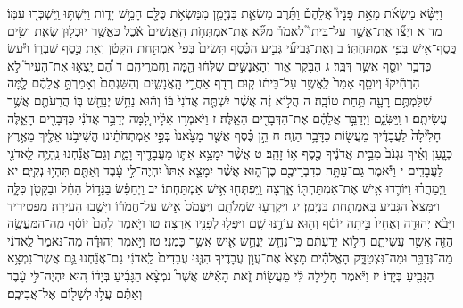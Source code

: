 \documentclass[twoside, openany, parskip=half, 11pt]{book}
\begin{document}
וַיִּשָּׂ֨א מַשְׂאֹ֜ת מֵאֵ֣ת פָּנָיו֮ אֲלֵהֶם֒ וַתֵּ֜רֶב מַשְׂאַ֧ת בִּנְיָמִ֛ן מִמַּשְׂאֹ֥ת כֻּלָּ֖ם חָמֵ֣שׁ יָד֑וֹת וַיִּשְׁתּ֥וּ וַֽיִּשְׁכְּר֖וּ עִמּֽוֹ׃ מד א וַיְצַ֞ו אֶת־אֲשֶׁ֣ר עַל־בֵּיתוֹ֮ לֵאמֹר֒ מַלֵּ֞א אֶת־אַמְתְּחֹ֤ת הָֽאֲנָשִׁים֙ אֹ֔כֶל כַּאֲשֶׁ֥ר יוּכְל֖וּן שְׂאֵ֑ת וְשִׂ֥ים כֶּֽסֶף־אִ֖ישׁ בְּפִ֥י אַמְתַּחְתּֽוֹ׃ ב וְאֶת־גְּבִיעִ֞י גְּבִ֣יעַ הַכֶּ֗סֶף תָּשִׂים֙ בְּפִי֙ אַמְתַּ֣חַת הַקָּטֹ֔ן וְאֵ֖ת כֶּ֣סֶף שִׁבְר֑וֹ וַיַּ֕עַשׂ כִּדְבַ֥ר יוֹסֵ֖ף אֲשֶׁ֥ר דִּבֵּֽר׃ ג הַבֹּ֖קֶר א֑וֹר וְהָאֲנָשִׁ֣ים שֻׁלְּח֔וּ הֵ֖מָּה וַחֲמֹרֵיהֶֽם׃ ד הֵ֠ם יָֽצְא֣וּ אֶת־הָעִיר֮ לֹ֣א הִרְחִ֒יקוּ֒ וְיוֹסֵ֤ף אָמַר֙ לַֽאֲשֶׁ֣ר עַל־בֵּית֔וֹ ק֥וּם רְדֹ֖ף אַחֲרֵ֣י הָֽאֲנָשִׁ֑ים וְהִשַּׂגְתָּם֙ וְאָמַרְתָּ֣ אֲלֵהֶ֔ם לָ֛מָּה שִׁלַּמְתֶּ֥ם רָעָ֖ה תַּ֥חַת טוֹבָֽה׃ ה הֲל֣וֹא זֶ֗ה אֲשֶׁ֨ר יִשְׁתֶּ֤ה אֲדֹנִי֙ בּ֔וֹ וְה֕וּא נַחֵ֥שׁ יְנַחֵ֖שׁ בּ֑וֹ הֲרֵעֹתֶ֖ם אֲשֶׁ֥ר עֲשִׂיתֶֽם׃ ו וַֽיַּשִּׂגֵ֑ם וַיְדַבֵּ֣ר אֲלֵהֶ֔ם אֶת־הַדְּבָרִ֖ים הָאֵֽלֶּה׃ ז וַיֹּאמְר֣וּ אֵלָ֔יו לָ֚מָּה יְדַבֵּ֣ר אֲדֹנִ֔י כַּדְּבָרִ֖ים הָאֵ֑לֶּה חָלִ֙ילָה֙ לַעֲבָדֶ֔יךָ מֵעֲשׂ֖וֹת כַּדָּבָ֥ר הַזֶּֽה׃ ח הֵ֣ן כֶּ֗סֶף אֲשֶׁ֤ר מָצָ֙אנוּ֙ בְּפִ֣י אַמְתְּחֹתֵ֔ינוּ הֱשִׁיבֹ֥נוּ אֵלֶ֖יךָ מֵאֶ֣רֶץ כְּנָ֑עַן וְאֵ֗יךְ נִגְנֹב֙ מִבֵּ֣ית אֲדֹנֶ֔יךָ כֶּ֖סֶף א֥וֹ זָהָֽב׃ ט אֲשֶׁ֨ר יִמָּצֵ֥א אִתּ֛וֹ מֵעֲבָדֶ֖יךָ וָמֵ֑ת וְגַם־אֲנַ֕חְנוּ נִֽהְיֶ֥ה לַֽאדֹנִ֖י לַעֲבָדִֽים׃ י וַיֹּ֕אמֶר גַּם־עַתָּ֥ה כְדִבְרֵיכֶ֖ם כֶּן־ה֑וּא אֲשֶׁ֨ר יִמָּצֵ֤א אִתּוֹ֙ יִהְיֶה־לִּ֣י עָ֔בֶד וְאַתֶּ֖ם תִּהְי֥וּ נְקִיִּֽם׃ יא וַֽיְמַהֲר֗וּ וַיּוֹרִ֛דוּ אִ֥ישׁ אֶת־אַמְתַּחְתּ֖וֹ אָ֑רְצָה וַֽיִּפְתְּח֖וּ אִ֥ישׁ אַמְתַּחְתּֽוֹ׃ יב וַיְחַפֵּ֕שׂ בַּגָּד֣וֹל הֵחֵ֔ל וּבַקָּטֹ֖ן כִּלָּ֑ה וַיִּמָּצֵא֙ הַגָּבִ֔יעַ בְּאַמְתַּ֖חַת בִּנְיָמִֽן׃ יג וַֽיִּקְרְע֖וּ שִׂמְלֹתָ֑ם וַֽיַּעֲמֹס֙ אִ֣ישׁ עַל־חֲמֹר֔וֹ וַיָּשֻׁ֖בוּ הָעִֽירָה׃ מפטיריד וַיָּבֹ֨א יְהוּדָ֤ה וְאֶחָיו֙ בֵּ֣יתָה יוֹסֵ֔ף וְה֖וּא עוֹדֶ֣נּוּ שָׁ֑ם וַיִּפְּל֥וּ לְפָנָ֖יו אָֽרְצָה׃ טו וַיֹּ֤אמֶר לָהֶם֙ יוֹסֵ֔ף מָֽה־הַמַּעֲשֶׂ֥ה הַזֶּ֖ה אֲשֶׁ֣ר עֲשִׂיתֶ֑ם הֲל֣וֹא יְדַעְתֶּ֔ם כִּֽי־נַחֵ֧שׁ יְנַחֵ֛שׁ אִ֖ישׁ אֲשֶׁ֥ר כָּמֹֽנִי׃ טז וַיֹּ֣אמֶר יְהוּדָ֗ה מַה־נֹּאמַר֙ לַֽאדֹנִ֔י מַה־נְּדַבֵּ֖ר וּמַה־נִּצְטַדָּ֑ק הָאֱלֹהִ֗ים מָצָא֙ אֶת־עֲוֺ֣ן עֲבָדֶ֔יךָ הִנֶּ֤נּוּ עֲבָדִים֙ לַֽאדֹנִ֔י גַּם־אֲנַ֕חְנוּ גַּ֛ם אֲשֶׁר־נִמְצָ֥א הַגָּבִ֖יעַ בְּיָדֽוֹ׃ יז וַיֹּ֕אמֶר חָלִ֣ילָה לִּ֔י מֵעֲשׂ֖וֹת זֹ֑את הָאִ֡ישׁ אֲשֶׁר֩ נִמְצָ֨א הַגָּבִ֜יעַ בְּיָד֗וֹ ה֚וּא יִהְיֶה־לִּ֣י עָ֔בֶד וְאַתֶּ֕ם עֲל֥וּ לְשָׁל֖וֹם אֶל־אֲבִיכֶֽם׃
\end{document}
